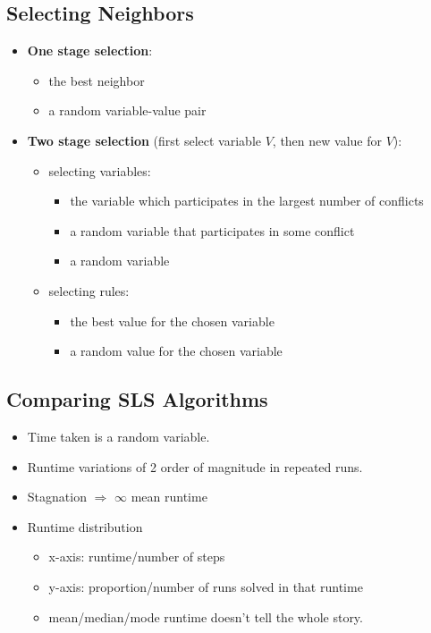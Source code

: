 \documentclass{article}
\begin{document}
\subsection{Selecting Neighbors}

\begin{itemize}
    \item \textbf{One stage selection}:
        \begin{itemize}
            \item the best neighbor
            \item a random variable-value pair
        \end{itemize}
    \item \textbf{Two stage selection} (first select variable $V$, then new value for $V$):
        \begin{itemize}
            \item selecting variables:
                \begin{itemize}
                    \item the variable which participates in the largest number of conflicts
                    \item a random variable that participates in some conflict
                    \item a random variable
                \end{itemize}
            \item selecting rules:
                \begin{itemize}
                    \item the best value for the chosen variable
                    \item a random value for the chosen variable
                \end{itemize}
        \end{itemize}
\end{itemize}

\subsection{Comparing SLS Algorithms}

\begin{itemize}
    \item Time taken is a random variable.
    \item Runtime variations of 2 order of magnitude in repeated runs.
    \item Stagnation $\Rightarrow$ $\infty$ mean runtime
    \item Runtime distribution
        \begin{itemize}
            \item x-axis: runtime/number of steps
            \item y-axis: proportion/number of runs solved in that runtime
            \item mean/median/mode runtime doesn't tell the whole story.
        \end{itemize}
\end{itemize}
\end{document}
